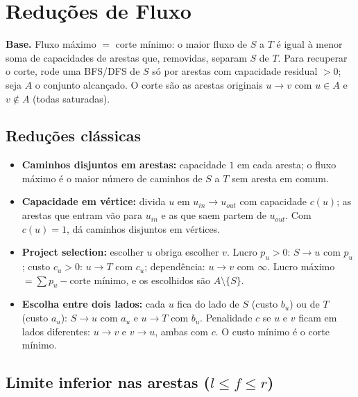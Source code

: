 \section{Reduções de Fluxo}

\textbf{Base.} Fluxo máximo $=$ corte mínimo: o maior fluxo de $S$ a $T$ é igual à menor soma de capacidades de
arestas que, removidas, separam $S$ de $T$. Para recuperar o corte, rode uma BFS/DFS de $S$ só por arestas com
capacidade residual $> 0$; seja $A$ o conjunto alcançado. O corte são as arestas originais $u \to v$ com $u \in A$
e $v \notin A$ (todas saturadas).

\subsection*{Reduções clássicas}

\begin{itemize}
  \item \textbf{Caminhos disjuntos em arestas:} capacidade $1$ em cada aresta; o fluxo máximo é o maior número de
        caminhos de $S$ a $T$ sem aresta em comum.
  \item \textbf{Capacidade em vértice:} divida $u$ em $u_{in} \to u_{out}$ com capacidade $c(u)$; as arestas que entram
        vão para $u_{in}$ e as que saem partem de $u_{out}$. Com $c(u) = 1$, dá caminhos disjuntos em vértices.
  \item \textbf{Project selection:} escolher $u$ obriga escolher $v$. Lucro $p_u > 0$: $S \to u$ com $p_u$;
        custo $c_u > 0$: $u \to T$ com $c_u$; dependência: $u \to v$ com $\infty$.
        Lucro máximo $= \sum p_u - \text{corte mínimo}$, e os escolhidos são $A \setminus \{S\}$.
  \item \textbf{Escolha entre dois lados:} cada $u$ fica do lado de $S$ (custo $b_u$) ou de $T$ (custo $a_u$):
        $S \to u$ com $a_u$ e $u \to T$ com $b_u$. Penalidade $c$ se $u$ e $v$ ficam em lados diferentes:
        $u \to v$ e $v \to u$, ambas com $c$. O custo mínimo é o corte mínimo.
\end{itemize}

\subsection*{Limite inferior nas arestas ($l \le f \le r$)}

